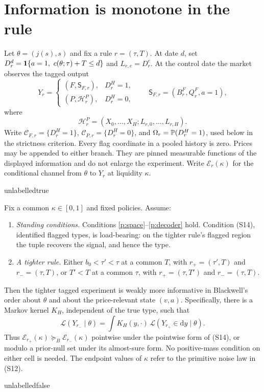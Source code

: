 
\section{Information is monotone in the rule}
\label{sec:blackwell}

Let $\theta=(j(s),s)$ and fix a rule $r=(\tau,T)$. At date $d$, set
$D_r^d=\mathbf{1}\{a=1,\ c(\theta;\tau)+T\leq d\}$ and $L_{r,e}=D_r^e$. At the control date the market
observes the tagged output
\[
Y_r=
\begin{cases}
(F,\mathsf S_{F,r}),&D_r^H=1,\\
(P,\mathcal H^P_r),&D_r^H=0,
\end{cases}
\qquad
\mathsf S_{F,r}=(B_r^F,Q_r^F,a{=}1),
\]
where
\[
\mathcal H^P_r=(X_0,\ldots,X_H;L_{r,0},\ldots,L_{r,H}).
\]
Write $\mathcal C_{F,r}=\{D_r^H=1\}$, $\mathcal C_{P,r}=\{D_r^H=0\}$, and
$\Omega_r=\mathbb{P}(D_r^H=1)$, used below in the strictness criterion.
Every flag coordinate in a pooled history is zero. Prices may be appended to either branch. They
are pinned measurable functions of the displayed information and do not enlarge the experiment.
Write $\mathcal E_r(\kappa)$ for the conditional channel from $\theta$ to $Y_r$ at liquidity
$\kappa$.

\csname unlabelledtrue\endcsname
\begin{theorem}
\label{thm:blackwell}
Fix a common $\kappa\in[0,1]$ and fixed policies. Assume:
\begin{enumerate}[label=(B\arabic*),leftmargin=3.0em,itemsep=3pt]
\item \emph{Standing conditions.} Conditions \ref{p:space}--\ref{p:decoder} hold. Condition (S14),
  identified flagged types, is load-bearing: on the tighter rule's
  flagged region the tuple recovers the signal, and hence the type.
\item \emph{A tighter rule.} Either $b_0<\tau'<\tau$ at a common $T$, with
  $r_+=(\tau',T)$ and $r_-=(\tau,T)$, or $T'<T$ at a common $\tau$, with
  $r_+=(\tau,T')$ and $r_-=(\tau,T)$.
\end{enumerate}
Then the tighter tagged experiment is weakly more informative in Blackwell's order about
$\theta$ and about the price-relevant state $(v,a)$. Specifically, there is a Markov kernel $K_H$,
independent of the true type, such that
\begin{equation}
\label{eq:blackwell-kernel}
\mathcal L(Y_{r_-}\mid\theta)
=\int K_H(y,\mathord\cdot)\,\mathcal L(Y_{r_+}\in\mathrm dy\mid\theta).
\end{equation}
Thus $\mathcal E_{r_+}(\kappa)\succeq_B\mathcal E_{r_-}(\kappa)$ pointwise under the pointwise
form of (S14), or modulo a prior-null set under its almost-sure form. No positive-mass
condition on either cell is needed. The endpoint values of $\kappa$ refer to the primitive noise
law in (S12).
\end{theorem}
\csname unlabelledfalse\endcsname

